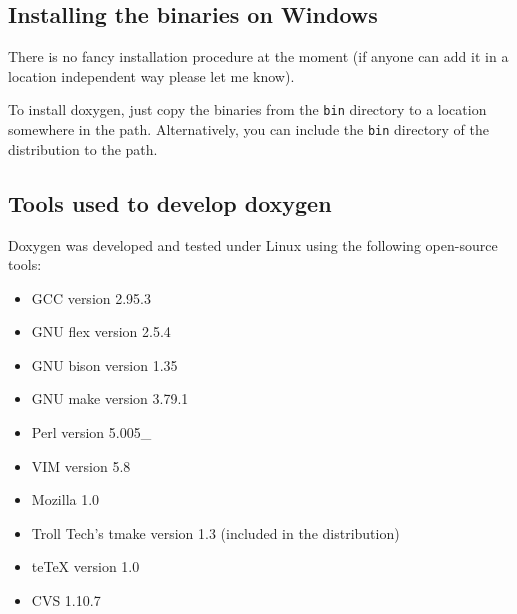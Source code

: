 \subsection{Installing the binaries on Windows}\label{install_install_bin_windows}
There is no fancy installation procedure at the moment (if anyone can add it in a location independent way please let me know).

To install doxygen, just copy the binaries from the {\tt bin} directory to a location somewhere in the path. Alternatively, you can include the {\tt bin} directory of the distribution to the path.\subsection{Tools used to develop doxygen}\label{install_build_tools}
Doxygen was developed and tested under Linux using the following open-source tools: \begin{itemize}
\item GCC version 2.95.3 \item GNU flex version 2.5.4 \item GNU bison version 1.35 \item GNU make version 3.79.1 \item Perl version 5.005\_ \item VIM version 5.8 \item Mozilla 1.0 \item Troll Tech's tmake version 1.3 (included in the distribution) \item te\-Te\-X version 1.0 \item CVS 1.10.7 \end{itemize}


